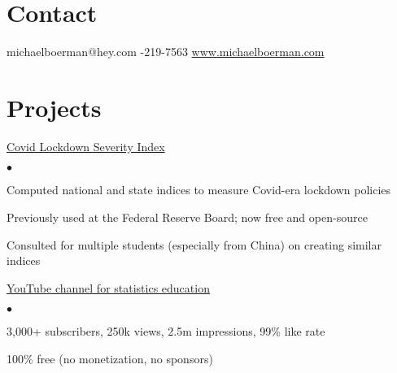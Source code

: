 \documentclass[margin, line]{res}
\newenvironment{list2}{
  \begin{list}{$\bullet$}{%
      \setlength{\itemsep}{0.04in}
      \setlength{\parsep}{0in} \setlength{\parskip}{0in}
      \setlength{\topsep}{0.05in} \setlength{\partopsep}{0in} 
      \setlength{\leftmargin}{\dimexpr 26pt-0.05in}}}
    {\end{list}}
\begin{document}
\address{Data scientist with M.S. and 3 years experience driving decisions by modeling financial and economic data.}
\begin{resume}

\vspace{-1mm}
\section{\sc Contact}

\faEnvelope  \hspace{1mm} {\ttfamily michaelboerman@hey.com} \hspace{7mm}
\faPhone  \hspace{1mm} {-219-7563} \hspace{10mm}
\faBriefcase \hspace{1mm} \href{https://www.michaelboerman.com/}{\ttfamily www.michaelboerman.com} \hspace{3.5mm}

\vspace{0mm}


\section{\sc Projects}

\faChartLine \hspace{0.5mm} \href{https://michaelboerman.github.io/lockdown_severity_index/}{Covid Lockdown Severity Index}
    \begin{list2}
        \item Computed national and state indices to measure Covid-era lockdown policies
        \item Previously used at the Federal Reserve Board; now free and open-source
        \item Consulted for multiple students (especially from China) on creating similar indices
    \end{list2}

 \hspace{0.5mm} \href{https://www.youtube.com/@explainedbymichael/videos}{YouTube channel for statistics education}
    \begin{list2}
        \item 3,000+ subscribers, 250k views, 2.5m impressions, 99\% like rate
        \item 100\% free (no monetization, no sponsors)
    \end{list2}


\end{resume}
\end{document}
